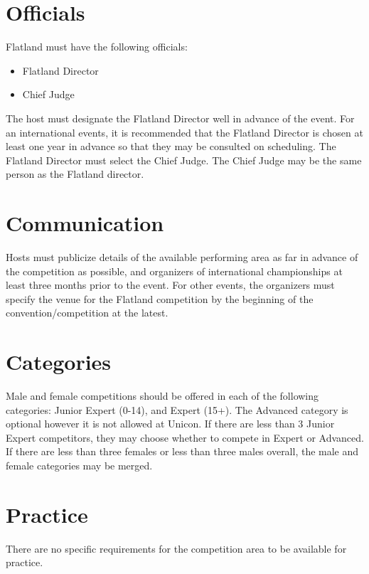 \section{Officials}

Flatland must have the following officials:
\begin{itemize}
\item Flatland Director
\item Chief Judge
\end{itemize}

The host must designate the Flatland Director well in advance of the event.
For an international events, it is recommended that the Flatland Director is chosen at least one year in advance so that they may be consulted on scheduling.
The Flatland Director must select the Chief Judge.
The Chief Judge may be the same person as the Flatland director.

\section{Communication}

Hosts must publicize details of the available performing area as far in advance of the competition as possible, and organizers of international championships at least three months prior to the event.
For other  events, the organizers must specify the venue for the Flatland competition by the beginning of the convention/competition at the latest.

\section{Categories}
Male and female competitions should be offered in each of the following categories: Junior Expert (0-14), and Expert (15+).
The Advanced category is optional however it is not allowed at Unicon.
If there are less than 3 Junior Expert competitors, they may choose whether to compete in Expert or Advanced.
If there are less than three females or less than three males overall, the male and female categories may be merged.

\section{Practice}

There are no specific requirements for the competition area to be available for practice.
